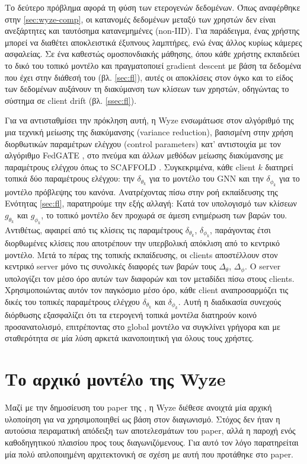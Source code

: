 Το δεύτερο πρόβλημα αφορά τη φύση των ετερογενών δεδομένων. Όπως αναφέρθηκε στην \autoref{sec:wyze-comp}, οι κατανομές δεδομένων μεταξύ των χρηστών δεν είναι ανεξάρτητες και ταυτόσημα κατανεμημένες (non-IID). Για παράδειγμα, ένας χρήστης μπορεί να διαθέτει αποκλειστικά έξυπνους λαμπτήρες, ενώ ένας άλλος κυρίως κάμερες ασφαλείας. Σε ένα καθεστώς ομοσπονδιακής μάθησης, όπου κάθε χρήστης εκπαιδεύει το δικό του τοπικό μοντέλο και πραγματοποιεί gradient descent με βάση τα δεδομένα που έχει στην διάθεσή του (βλ. \autoref{sec:fl}), αυτές οι αποκλίσεις στον όγκο και το είδος των δεδομένων αυξάνουν τη διακύμανση των κλίσεων των χρηστών, οδηγώντας το σύστημα σε client drift \cite{karimireddy_scaffold_2020} (βλ. \autoref{ssec:fl}).

Για να αντισταθμίσει την πρόκληση αυτή, η Wyze ενσωμάτωσε στον αλγόριθμό της μια τεχνική μείωσης της διακύμανσης (variance reduction), βασισμένη στην χρήση διορθωτικών παραμέτρων ελέγχου (control parameters) κατ' αντιστοιχία με τον αλγόριθμο FedGATE \cite{haddadpour_federated_2021}, στο πνεύμα και άλλων μεθόδων μείωσης διακύμανσης με παραμέτρους ελέγχου όπως το SCAFFOLD \cite{karimireddy_scaffold_2020}. Συγκεκριμένα, κάθε client $k$ διατηρεί τοπικά δύο παραμέτρους ελέγχου: την $\delta_{\theta_k}$ για το μοντέλο του GNN και την $\delta_{\phi_k}$ για το μοντέλο πρόβλεψης του κανόνα. Ανατρέχοντας πίσω στην ροή εκπαίδευσης της Ενότητας \ref{sec:fl}, παρατηρούμε την εξής αλλαγή: Κατά τον υπολογισμό των κλίσεων $g_{\theta_k}$ και $g_{\phi_k}$, το τοπικό μοντέλο δεν προχωρά σε άμεση ενημέρωση των βαρών του. Αντιθέτως, αφαιρεί από τις κλίσεις τις παραμέτρους $\delta_{\theta_k}$, $\delta_{\phi_k}$, παράγοντας έτσι διορθωμένες κλίσεις που αποτρέπουν την υπερβολική απόκλιση από το κεντρικό μοντέλο. Μετά το πέρας της τοπικής εκπαίδευσης, οι clients αποστέλλουν στον κεντρικό server μόνο τις συνολικές διαφορές των βαρών τους $\Delta_{\theta}$, $\Delta_{\phi}$. Ο server υπολογίζει τον μέσο όρο αυτών των διαφορών και τον μεταδίδει πίσω στους clients. Χρησιμοποιώντας αυτόν τον παγκόσμιο μέσο όρο, κάθε client αναπροσαρμόζει τις δικές του τοπικές παραμέτρους ελέγχου $\delta_{\theta_k}$ και $\delta_{\phi_k}$. Αυτή η διαδικασία συνεχούς διόρθωσης εξασφαλίζει ότι τα ετερογενή τοπικά μοντέλα διατηρούν κοινό προσανατολισμό, επιτρέποντας στο global μοντέλο να συγκλίνει γρήγορα και με σταθερότητα σε μία λύση αρκετά ικανοποιητική για όλους τους χρήστες.

\section{Το αρχικό μοντέλο της Wyze}\label{sec:wyze-baseline}
Μαζί με την δημοσίευση του paper της \cite{yao_fedrule_2022}, η Wyze διέθεσε ανοιχτά μία αρχική υλοποίηση \cite{yao_yh-yaofedrule_2025} για να χρησιμοποιηθεί ως βάση στον διαγωνισμό. Στόχος δεν ήταν η αυτούσια πειραματική απόδειξη των αποτελεσμάτων του paper, αλλά η παροχή ενός καθοδηγητικού πλαισίου προς τους διαγωνιζόμενους. Για αυτό τον λόγο παρατηρείται μία πολύ απλοποιημένη αρχιτεκτονική σε σχέση με αυτή που προτάθηκε στο paper.

